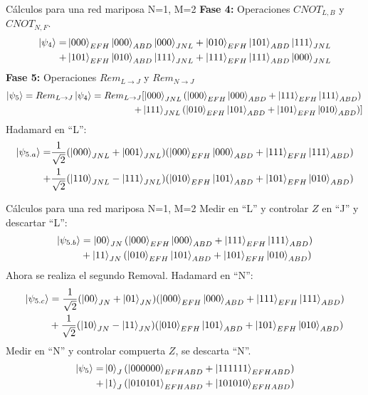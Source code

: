 \documentclass[10pt]{beamer}
\begin{document}
\begin{frame}{Cálculos para una red mariposa N=1, M=2}
  \textbf{Fase 4:} Operaciones $ CNOT_{L,B} $ y $ CNOT_{N,F} $.
    \begin{align*}
    \ket{\psi_{4}} = 
      & \ket{000}_{EFH} \ket{000}_{ABD} \ket{000}_{JNL} + \ket{010}_{EFH} \ket{101}_{ABD} \ket{111}_{JNL} \\
    +& \ket{101}_{EFH} \ket{010}_{ABD} \ket{111}_{JNL} + \ket{111}_{EFH} \ket{111}_{ABD} \ket{000}_{JNL}  
    \end{align*}
  \textbf{Fase 5:} Operaciones $ Rem_{L \rightarrow J} $ y  $ Rem_{N \rightarrow J} $ 
  \begin{align*}
  \ket{\psi_5}=  Rem_{L \rightarrow J} \ket{\psi_4} = Rem_{L \rightarrow J} & [ \ket{000}_{JNL}(\ket{000}_{EFH} \ket{000}_{ABD}+\ket{111}_{EFH} \ket{111}_{ABD}) \\
  + & \ket{111}_{JNL}(\ket{010}_{EFH} \ket{101}_{ABD}+\ket{101}_{EFH} \ket{010}_{ABD})]
  \end{align*}
  Hadamard en ``L'':
  \begin{align*}
  \ket{\psi_{5.a}}= & \dfrac{1}{\sqrt{2}}  (\ket{000}_{JNL}+\ket{001}_{JNL})(\ket{000}_{EFH}\ket{000}_{ABD}+\ket{111}_{EFH}\ket{111}_{ABD}) \\
  + & \dfrac{1}{\sqrt{2}} (\ket{110}_{JNL}-\ket{111}_{JNL})(\ket{010}_{EFH} \ket{101}_{ABD}+\ket{101}_{EFH} \ket{010}_{ABD})
  \end{align*}
\end{frame}

\begin{frame}{Cálculos para una red mariposa N=1, M=2}
  Medir en ``L'' y controlar $Z$ en ``J'' y descartar ``L'':
  \begin{align*}
  \ket{\psi_{5.b}} & = \ket{00}_{JN}(\ket{000}_{EFH}\ket{000}_{ABD}+\ket{111}_{EFH} \ket{111}_{ABD}) \\
  & + \ket{11}_{JN}(\ket{010}_{EFH}\ket{101}_{ABD}+\ket{101}_{EFH} \ket{010}_{ABD})
  \end{align*}
  Ahora se realiza el segundo Removal. Hadamard en ``N'':
  \begin{align*}
  \ket{\psi_{5.c}} &= \dfrac{1}{\sqrt{2}} (\ket{00}_{JN}+\ket{01}_{JN})(\ket{000}_{EFH}\ket{000}_{ABD}+\ket{111}_{EFH} \ket{111}_{ABD}) \\
  &+ \dfrac{1}{\sqrt{2}} (\ket{10}_{JN}-\ket{11}_{JN})(\ket{010}_{EFH}\ket{101}_{ABD}+\ket{101}_{EFH} \ket{010}_{ABD})
  \end{align*}
  Medir en ``N'' y controlar compuerta $Z$, se descarta ``N''.
  \begin{align*}
  \ket{\psi_5} = & \ket{0}_{J}(\ket{000000}_{EFHABD}+\ket{111111}_{EFHABD}) \\
  + & \ket{1}_{J}(\ket{010101}_{EFHABD}+\ket{101010}_{EFHABD})
  \end{align*}
\end{frame}
\end{document}
